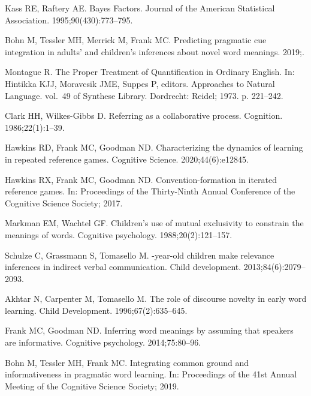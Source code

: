\documentclass[10pt,letterpaper]{article}
\begin{document}
\begin{thebibliography}{10}
Kass RE, Raftery AE.
\newblock Bayes Factors.
\newblock Journal of the American Statistical Association.
  1995;90(430):773--795.

Bohn M, Tessler MH, Merrick M, Frank MC.
\newblock Predicting pragmatic cue integration in adults' and children's
  inferences about novel word meanings. 2019;.

Montague R.
\newblock The Proper Treatment of Quantification in Ordinary {E}nglish.
\newblock In: Hintikka KJJ, Moravcsik JME, Suppes P, editors. Approaches to
  Natural Language. vol.~49 of Synthese Library. Dordrecht: Reidel; 1973. p.
  221--242.

Clark HH, Wilkes-Gibbs D.
\newblock Referring as a collaborative process.
\newblock Cognition. 1986;22(1):1--39.

Hawkins RD, Frank MC, Goodman ND.
\newblock Characterizing the dynamics of learning in repeated reference games.
\newblock Cognitive Science. 2020;44(6):e12845.

Hawkins RX, Frank MC, Goodman ND.
\newblock Convention-formation in iterated reference games.
\newblock In: Proceedings of the Thirty-Ninth Annual Conference of the
  {C}ognitive {S}cience {S}ociety; 2017.

Markman EM, Wachtel GF.
\newblock Children's use of mutual exclusivity to constrain the meanings of
  words.
\newblock Cognitive psychology. 1988;20(2):121--157.

Schulze C, Grassmann S, Tomasello M.
-year-old children make relevance inferences in indirect verbal
  communication.
\newblock Child development. 2013;84(6):2079--2093.

Akhtar N, Carpenter M, Tomasello M.
\newblock The role of discourse novelty in early word learning.
\newblock Child Development. 1996;67(2):635--645.

Frank MC, Goodman ND.
\newblock Inferring word meanings by assuming that speakers are informative.
\newblock Cognitive psychology. 2014;75:80--96.

Bohn M, Tessler MH, Frank MC.
\newblock Integrating common ground and informativeness in pragmatic word
  learning.
\newblock In: Proceedings of the 41st Annual Meeting of the {C}ognitive
  {S}cience {S}ociety; 2019.


\end{thebibliography}
\end{document}
